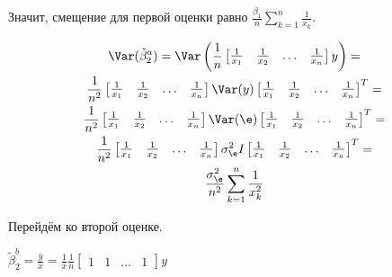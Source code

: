 \documentclass[pdftex,11pt,openany]{book}\usepackage[]{graphicx}\usepackage[]{color}
\begin{document}
\begin{solution}
Значит, смещение для первой оценки равно $\frac{\beta_1}{n}\sum_{k=1}^n \frac{1}{x_k}$.

\begin{multline}
\Var(\tilde{\beta}_2^a) = \Var\left(\frac{1}{n} \begin{bmatrix}
\frac{1}{x_1} & \frac{1}{x_2} & \ldots & \frac{1}{x_n}
\end{bmatrix} y\right) =\\
 \frac{1}{n^2} \begin{bmatrix}
\frac{1}{x_1} & \frac{1}{x_2} & \ldots & \frac{1}{x_n}
\end{bmatrix} \Var(y) \begin{bmatrix}
\frac{1}{x_1} & \frac{1}{x_2} & \ldots & \frac{1}{x_n}
\end{bmatrix}^T =\\
\frac{1}{n^2} \begin{bmatrix}
\frac{1}{x_1} & \frac{1}{x_2} & \ldots & \frac{1}{x_n}
\end{bmatrix} \Var(\e) \begin{bmatrix}
\frac{1}{x_1} & \frac{1}{x_2} & \ldots & \frac{1}{x_n}
\end{bmatrix}^T = \\
 \frac{1}{n^2} \begin{bmatrix}
\frac{1}{x_1} & \frac{1}{x_2} & \ldots & \frac{1}{x_n}
\end{bmatrix} \sigma_{\e}^2 I \begin{bmatrix}
\frac{1}{x_1} & \frac{1}{x_2} & \ldots & \frac{1}{x_n}
\end{bmatrix}^T =\\
\frac{\sigma^2_{\e}}{n^2}\sum_{k=1}^n \frac{1}{x_k^2}
\end{multline}

Перейдём ко второй оценке.

$\tilde{\beta}_2^b = \frac{\overline{y}}{\overline{x}} = \frac{1}{\overline{x}} \frac{1}{n} \begin{bmatrix}
1 & 1 & \ldots & 1
\end{bmatrix} y$



\end{solution}
\end{document}

